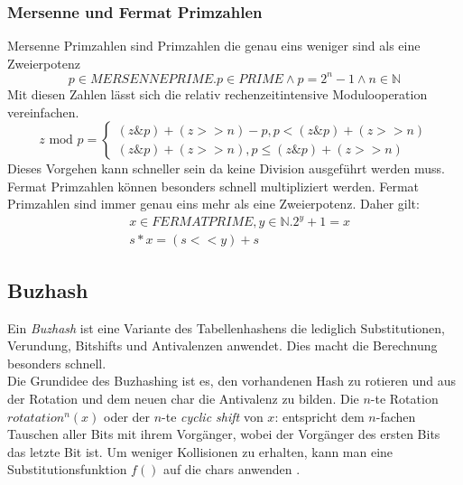 \subsubsection{Mersenne und Fermat Primzahlen}


Mersenne Primzahlen sind Primzahlen die genau eins weniger sind als eine Zweierpotenz
\begin{equation}\nonumber
	p \in MERSENNEPRIME. p \in PRIME \land p= 2^n -1 \land n \in \mathbb{N} 
\end{equation} 
Mit diesen Zahlen lässt sich die relativ rechenzeitintensive Modulooperation vereinfachen.
\begin{equation}\nonumber
	z \text{ mod } p =
	\begin{cases}\!%
			(z\&p)+(z>>n)-p, p<(z\&p)+(z>>n) \nonumber \\
			(z\&p)+(z>>n) , p\leq(z\&p)+(z>>n) \nonumber
	\end{cases}
\end{equation}
\noindent
Dieses Vorgehen kann schneller sein da keine Division ausgeführt werden muss.\\
Fermat Primzahlen können besonders schnell multipliziert werden.  Fermat Primzahlen sind immer genau eins mehr als eine Zweierpotenz. Daher gilt:
\begin{align}\nonumber
	&x\in FERMATPRIME,y\in\mathbb{N} . 2^y+1=x \\
	&s*x=(s<<y)+s  \nonumber
\end{align} 
	
\subsection{Buzhash}

Ein \emph{Buzhash} ist eine Variante des Tabellenhashens die lediglich Substitutionen, Verundung, Bitshifts und Antivalenzen anwendet. Dies macht die Berechnung besonders schnell.\\
Die Grundidee des Buzhashing ist es, den vorhandenen Hash  zu rotieren und aus der Rotation und dem neuen char die Antivalenz zu bilden.
Die $n$-te Rotation $rotatation^n(x)$  oder der $n$-te \emph{cyclic shift} von $x$:  entspricht dem $n$-fachen Tauschen aller Bits mit ihrem Vorgänger, wobei der Vorgänger des ersten Bits das letzte Bit ist. Um weniger Kollisionen zu erhalten, kann man eine Substitutionsfunktion $f()$ auf die chars anwenden \cite{buzhash}\cite{joyhash}.

